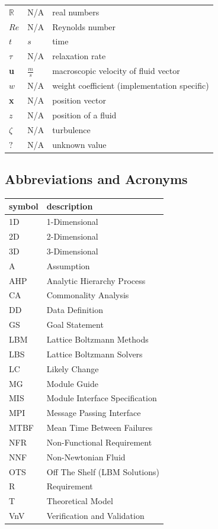 \documentclass[12pt]{article}
\begin{document}
\begin{longtable*}{l l p{12cm}}
\\
$\mathbb{R}$ & N/A & real numbers
\\
$Re$ & N/A & Reynolds number
\\
$t$ & $s$ & time
\\
$\tau$ & N/A & relaxation rate
\\
\textbf{u} & $\frac{m}{s}$ & macroscopic velocity of fluid vector
\\
$w$ & N/A & weight coefficient (implementation specific)
\\
\textbf{x} & N/A & position vector
\\
$z$ & N/A & position of a fluid
\\
$\zeta$ & N/A & turbulence
\\
$?$ & N/A & unknown value 
\\
\bottomrule
\end{longtable*}

\subsection{Abbreviations and Acronyms}

\renewcommand{\arraystretch}{1.2}
\begin{tabular}{l l} 
  \toprule		
  \textbf{symbol} & \textbf{description}\\
  \midrule
  1D & 1-Dimensional\\ 
  2D & 2-Dimensional\\ 
  3D & 3-Dimensional\\ 
  A & Assumption\\
  AHP & Analytic Hierarchy Process\\
  CA & Commonality Analysis\\
  DD & Data Definition\\
  GS & Goal Statement\\
  LBM & Lattice Boltzmann Methods\\
  LBS & Lattice Boltzmann Solvers\\
  LC & Likely Change\\
  MG & Module Guide\\
  MIS & Module Interface Specification\\
  MPI & Message Passing Interface\\
  MTBF & Mean Time Between Failures\\
  NFR & Non-Functional Requirement\\
  NNF & Non-Newtonian Fluid\\
  OTS & Off The Shelf (LBM Solutions)\\
  R & Requirement\\
  T & Theoretical Model\\
  VnV & Verification and Validation\\
  \bottomrule
\end{tabular}\\
\end{document}
